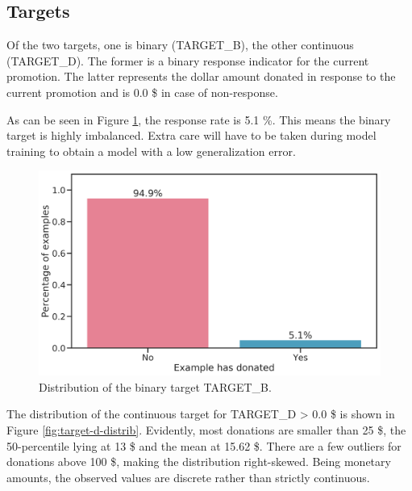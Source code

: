 \documentclass[
  11pt,
  a4paper,
  DIV=12,captions=tableheading,oneside,titlepage]{scrbook}
\begin{document}
\hypertarget{targets}{%
\subsection{Targets}\label{targets}}

Of the two targets, one is binary (TARGET\_B), the other continuous (TARGET\_D). The former is a binary response indicator for the current promotion. The latter represents the dollar amount donated in response to the current promotion and is 0.0 \$ in case of non-response.

As can be seen in Figure \ref{fig:target-ratio}, the response rate is 5.1 \%. This means the binary target is highly imbalanced. Extra care will have to be taken during model training to obtain a model with a low generalization error.



\begin{figure}

{\centering \includegraphics[width=0.7\linewidth]{figures/eda/ratio-binary} 

}

\caption{Distribution of the binary target TARGET\_B.}\label{fig:target-ratio}
\end{figure}

The distribution of the continuous target for TARGET\_D \textgreater{} 0.0 \$ is shown in Figure \ref{fig:target-d-distrib}. Evidently, most donations are smaller than 25 \$, the 50-percentile lying at 13 \$ and the mean at 15.62 \$. There are a few outliers for donations above 100 \$, making the distribution right-skewed. Being monetary amounts, the observed values are discrete rather than strictly continuous.
\end{document}
